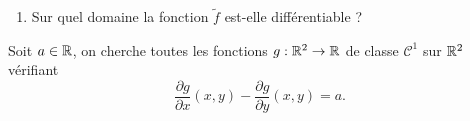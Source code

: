 \documentclass[a4paper]{tp_um}
\begin{document}
\begin{enumerate}

    \item Sur quel domaine la fonction $\tilde f$ est-elle différentiable ?
        \blanc{5cm}

        


\end{enumerate}


\exo{} Soit $a\in\mathbb{R}$, on cherche toutes les fonctions $g:\mathbb{R}^2\to\mathbb{R}$ de classe $\mathcal C^1$ sur $\mathbb{R}^2$ vérifiant 
\begin{equation}\label{eq.par}
    \frac{\partial g}{\partial x} (x,y) - \frac{\partial g}{\partial y}(x,y) = a.
\end{equation}
\end{document}
